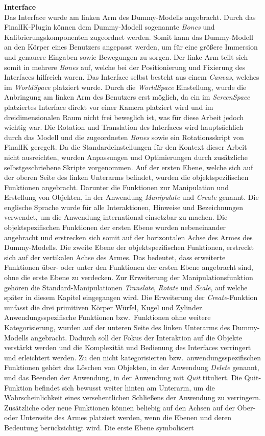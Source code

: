 \noindent \textbf{Interface}\\
Das Interface wurde am linken Arm des Dummy-Modells angebracht. Durch das FinalIK-Plugin können dem Dummy-Modell sogenannte \textit{Bones} und Kalibrierungskomponenten zugeordnet werden. Somit kann das Dummy-Modell an den Körper eines Benutzers angepasst werden, um für eine größere Immersion und genauere Eingaben sowie Bewegungen zu sorgen. Der linke Arm teilt sich somit in mehrere \textit{Bones} auf, welche bei der Positionierung und Fixierung des Interfaces hilfreich waren. Das Interface selbst besteht aus einem \textit{Canvas}, welches im \textit{WorldSpace} platziert wurde. Durch die \textit{WorldSpace} Einstellung, wurde die Anbringung am linken Arm des Benutzers erst möglich, da ein im \textit{ScreenSpace} platziertes Interface direkt vor einer Kamera platziert wird und im dreidimensionalen Raum nicht frei beweglich ist, was für diese Arbeit jedoch wichtig war. Die Rotation und Translation des Interfaces wird hauptsächlich durch das Modell und die zugeordneten \textit{Bones} sowie ein Rotationsskript von FinalIK geregelt. Da die Standardeinstellungen für den Kontext dieser Arbeit nicht ausreichten, wurden Anpassungen und Optimierungen durch zusätzliche selbstgeschriebene Skripte vorgenommen. Auf der ersten Ebene, welche sich auf der oberen Seite des linken Unterarms befindet, wurden die objektspezifischen Funktionen angebracht. Darunter die Funktionen zur Manipulation und Erstellung von Objekten, in der Anwendung \textit{Manipulate} und \textit{Create} genannt. Die englische Sprache wurde für alle Interaktionen, Hinweise und Bezeichnungen verwendet, um die Anwendung international einsetzbar zu machen. Die objektspezifischen Funktionen der ersten Ebene wurden nebeneinander angebracht und erstrecken sich somit auf der horizontalen Achse des Armes des Dummy-Modells. Die zweite Ebene der objektspezifischen Funktionen, erstreckt sich auf der vertikalen Achse des Armes. Das bedeutet, dass erweiterte Funktionen über- oder unter den Funktionen der ersten Ebene angebracht sind, ohne die erste Ebene zu verdecken. Zur Erweiterung der Manipulationsfunktion gehören die Standard-Manipulationen \textit{Translate}, \textit{Rotate} und \textit{Scale}, auf welche später in diesem Kapitel eingegangen wird. Die Erweiterung der \textit{Create}-Funktion umfasst die drei primitiven Körper Würfel, Kugel und Zylinder. Anwendungsspezifische Funktionen bzw.~Funktionen ohne weitere Kategorisierung, wurden auf der unteren Seite des linken Unterarms des Dummy-Modells angebracht. Dadurch soll der Fokus der Interaktion auf die Objekte verstärkt werden und die Komplexität und Bedienung des Interfaces verringert und erleichtert werden. Zu den nicht kategorisierten bzw.~anwendungsspezifischen Funktionen gehört das Löschen von Objekten, in der Anwendung \textit{Delete} genannt, und das Beenden der Anwendung, in der Anwendung mit \textit{Quit} tituliert. Die Quit-Funktion befindet sich bewusst weiter hinten am Unterarm, um die Wahrscheinlichkeit eines versehentlichen Schließens der Anwendung zu verringern. Zusätzliche oder neue Funktionen können beliebig auf den Achsen auf der Ober- oder Unterseite des Armes platziert werden, wenn die Ebenen und deren Bedeutung berücksichtigt wird. Die erste Ebene symbolisiert 